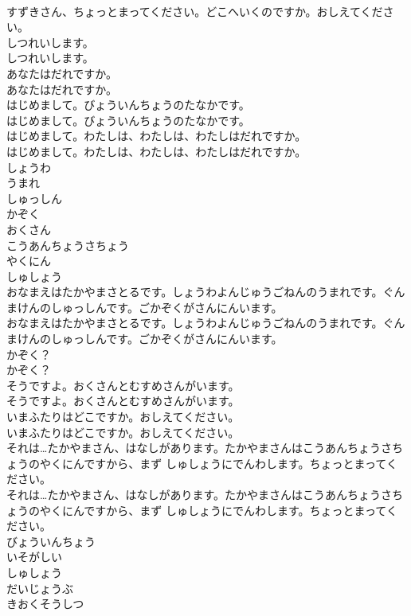 \documentclass[8pt]{extreport}
\begin{document}
\begin{CJK}{UTF8}{min}
\\	すずきさん、ちょっとまってください。どこへいくのですか。おしえてください。 
\\	しつれいします。	
\\	しつれいします。 
\\	あなたはだれですか。	
\\	あなたはだれですか。 
\\	はじめまして。びょういんちょうのたなかです。	
\\	はじめまして。びょういんちょうのたなかです。 
\\	はじめまして。わたしは、わたしは、わたしはだれですか。	
\\	はじめまして。わたしは、わたしは、わたしはだれですか。 
\\	しょうわ
\\	うまれ
\\	しゅっしん
\\	かぞく
\\	おくさん
\\	こうあんちょうさちょう
\\	やくにん
\\	しゅしょう
\\	おなまえはたかやまさとるです。しょうわよんじゅうごねんのうまれです。ぐんまけんのしゅっしんです。ごかぞくがさんにんいます。	
\\	おなまえはたかやまさとるです。しょうわよんじゅうごねんのうまれです。ぐんまけんのしゅっしんです。ごかぞくがさんにんいます。 
\\	かぞく？	
\\	かぞく？ 
\\	そうですよ。おくさんとむすめさんがいます。	
\\	そうですよ。おくさんとむすめさんがいます。 
\\	いまふたりはどこですか。おしえてください。	
\\	いまふたりはどこですか。おしえてください。 
\\	それは…たかやまさん、はなしがあります。たかやまさんはこうあんちょうさちょうのやくにんですから、まず しゅしょうにでんわします。ちょっとまってください。	
\\	それは…たかやまさん、はなしがあります。たかやまさんはこうあんちょうさちょうのやくにんですから、まず しゅしょうにでんわします。ちょっとまってください。 
\\	びょういんちょう
\\	いそがしい
\\	しゅしょう
\\	だいじょうぶ
\\	きおくそうしつ

\end{CJK}
\end{document}
